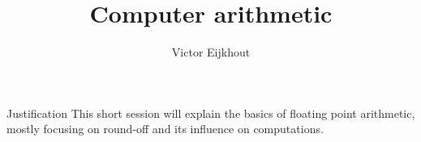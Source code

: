 \documentclass[11pt,headernav]{beamer}
\begin{document}

\title{Computer arithmetic}
\author{Victor Eijkhout}
\date{\hpcsemester}

\begin{frame}
  \titlepage
\end{frame}

\begin{frame}{Justification}
  This short session will explain the basics of floating point
  arithmetic, mostly focusing on round-off and its influence
  on computations.
\end{frame}


\end{document}
